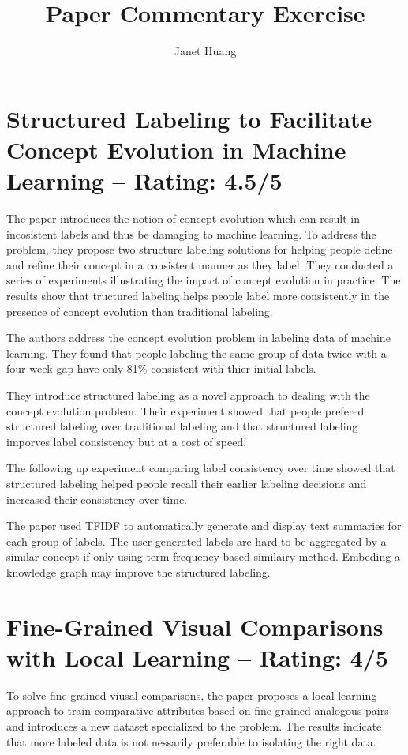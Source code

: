 \documentclass[a4paper]{article}
\title{Paper Commentary Exercise}
\author{Janet Huang}
\begin{document}
\maketitle
\section{Structured Labeling to Facilitate Concept Evolution in Machine Learning -- Rating: 4.5/5}
The paper \cite{Kulesza2014} introduces the notion of concept evolution which can result in incosistent labels and thus be damaging to machine learning. To address the problem, they propose two structure labeling solutions for helping people define and refine their concept in a consistent manner as they label. They conducted a series of experiments illustrating the impact of concept evolution in practice. The results show that tructured labeling helps people label more consistently in the presence of concept evolution than traditional labeling.

The authors address the concept evolution problem in labeling data of machine learning. They found that people labeling the same group of data twice with a four-week gap have only 81\% consistent with thier initial labels.

They introduce structured labeling as a novel approach to dealing with the concept evolution problem. Their experiment showed that people prefered structured labeling over traditional labeling and that structured labeling imporves label consistency but at a cost of speed.

The following up experiment comparing label consistency over time showed that structured labeling helped people recall their earlier labeling decisions and increased their consistency over time.

The paper used TFIDF to automatically generate and display text summaries for each group of labels. The user-generated labels are hard to be aggregated by a similar concept if only using term-frequency based similairy method. Embeding a knowledge graph may improve the structured labeling.

\section{Fine-Grained Visual Comparisons with Local Learning -- Rating: 4/5}
To solve fine-grained viusal comparisons, the paper \cite{fine-grained} proposes a local learning approach to train comparative attributes based on fine-grained analogous pairs and introduces a new dataset specialized to the problem. The results indicate that more labeled data is not nessarily preferable to isolating the right data. \\
\end{document}

